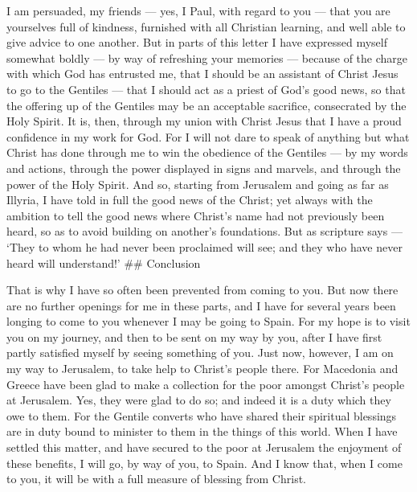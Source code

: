  I am persuaded, my friends --- yes, I Paul, with regard to
you --- that you are yourselves full of kindness, furnished with all
Christian learning, and well able to give advice to one another.
 But in parts of this letter I have expressed myself
somewhat boldly --- by way of refreshing your memories --- 
because of the charge with which God has entrusted me, that I should be
an assistant of Christ Jesus to go to the Gentiles --- that I should act
as a priest of God's good news, so that the offering up of the Gentiles
may be an acceptable sacrifice, consecrated by the Holy Spirit.
 It is, then, through my union with Christ Jesus that I
have a proud confidence in my work for God.  For I will not
dare to speak of anything but what Christ has done through me to win the
obedience of the Gentiles ---  by my words and actions,
through the power displayed in signs and marvels, and through the power
of the Holy Spirit. And so, starting from Jerusalem and going as far as
Illyria, I have told in full the good news of the Christ; 
yet always with the ambition to tell the good news where Christ's name
had not previously been heard, so as to avoid building on another's
foundations.  But as scripture says --- `They to whom he
had never been proclaimed will see; and they who have never heard will
understand!' \#\# Conclusion

 That is why I have so often been prevented from coming to
you.  But now there are no further openings for me in these
parts, and I have for several years been longing to come to you whenever
I may be going to Spain.  For my hope is to visit you on my
journey, and then to be sent on my way by you, after I have first partly
satisfied myself by seeing something of you.  Just now,
however, I am on my way to Jerusalem, to take help to Christ's people
there.  For Macedonia and Greece have been glad to make a
collection for the poor amongst Christ's people at Jerusalem.
 Yes, they were glad to do so; and indeed it is a duty
which they owe to them. For the Gentile converts who have shared their
spiritual blessings are in duty bound to minister to them in the things
of this world.  When I have settled this matter, and have
secured to the poor at Jerusalem the enjoyment of these benefits, I will
go, by way of you, to Spain.  And I know that, when I come
to you, it will be with a full measure of blessing from Christ.

